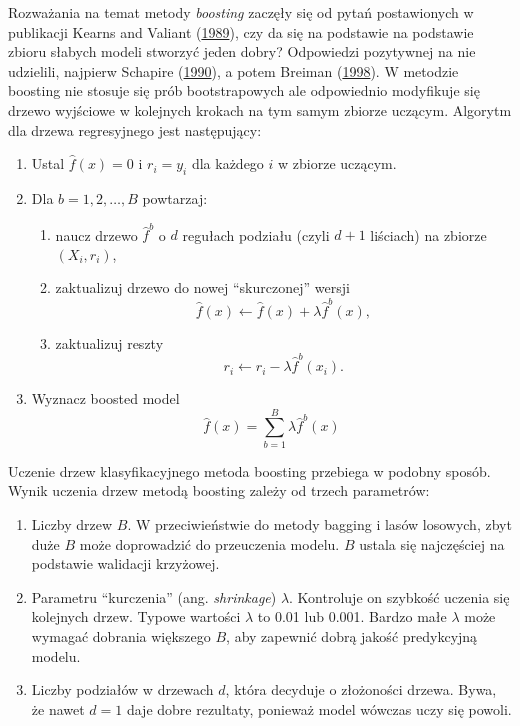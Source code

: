 \documentclass[]{book}
\providecommand{\tightlist}{%
  \setlength{\itemsep}{0pt}\setlength{\parskip}{0pt}}
\theoremstyle{plain}
\theoremstyle{definition}
\theoremstyle{definition}
\theoremstyle{definition}
\theoremstyle{definition}
\theoremstyle{remark}
\begin{document}
Rozważania na temat metody \emph{boosting} zaczęły się od pytań postawionych w publikacji Kearns and Valiant (\protect\hyperlink{ref-kearns1989}{1989}), czy da się na podstawie na podstawie zbioru słabych modeli stworzyć jeden dobry? Odpowiedzi pozytywnej na nie udzielili, najpierw Schapire (\protect\hyperlink{ref-schapire1990}{1990}), a potem Breiman (\protect\hyperlink{ref-breiman1998}{1998}). W metodzie boosting nie stosuje się prób bootstrapowych ale odpowiednio modyfikuje się drzewo wyjściowe w kolejnych krokach na tym samym zbiorze uczącym. Algorytm dla drzewa regresyjnego jest następujący:

\begin{enumerate}
\def\labelenumi{\arabic{enumi}.}
\tightlist
\item
  Ustal \(\hat{f}(x)=0\) i \(r_i=y_i\) dla każdego \(i\) w zbiorze uczącym.
\item
  Dla \(b=1,2,\ldots, B\) powtarzaj:

  \begin{enumerate}
  \def\labelenumii{\alph{enumii})}
  \tightlist
  \item
    naucz drzewo \(\hat{f}^b\) o \(d\) regułach podziału (czyli \(d+1\) liściach) na zbiorze \((X_i, r_i)\),
  \item
    zaktualizuj drzewo do nowej ``skurczonej'' wersji
    \begin{equation}
     \hat{f}(x)\leftarrow \hat{f}(x)+\lambda\hat{f}^b(x),
    \end{equation}
  \item
    zaktualizuj reszty
    \begin{equation}
     r_i\leftarrow r_i-\lambda\hat{f}^b(x_i).
    \end{equation}
  \end{enumerate}
\item
  Wyznacz boosted model
  \begin{equation}
    \hat{f}(x) = \sum_{b=1}^B\lambda\hat{f}^b(x)
  \end{equation}
\end{enumerate}

Uczenie drzew klasyfikacyjnego metoda boosting przebiega w podobny sposób. Wynik uczenia drzew metodą boosting zależy od trzech parametrów:

\begin{enumerate}
\def\labelenumi{\arabic{enumi}.}
\tightlist
\item
  Liczby drzew \(B\). W przeciwieństwie do metody bagging i lasów losowych, zbyt duże \(B\) może doprowadzić do przeuczenia modelu. \(B\) ustala się najczęściej na podstawie walidacji krzyżowej.
\item
  Parametru ``kurczenia'' (ang. \emph{shrinkage}) \(\lambda\). Kontroluje on szybkość uczenia się kolejnych drzew. Typowe wartości \(\lambda\) to 0.01 lub 0.001. Bardzo małe \(\lambda\) może wymagać dobrania większego \(B\), aby zapewnić dobrą jakość predykcyjną modelu.
\item
  Liczby podziałów w drzewach \(d\), która decyduje o złożoności drzewa. Bywa, że nawet \(d=1\) daje dobre rezultaty, ponieważ model wówczas uczy się powoli.
\end{enumerate}
\end{document}
